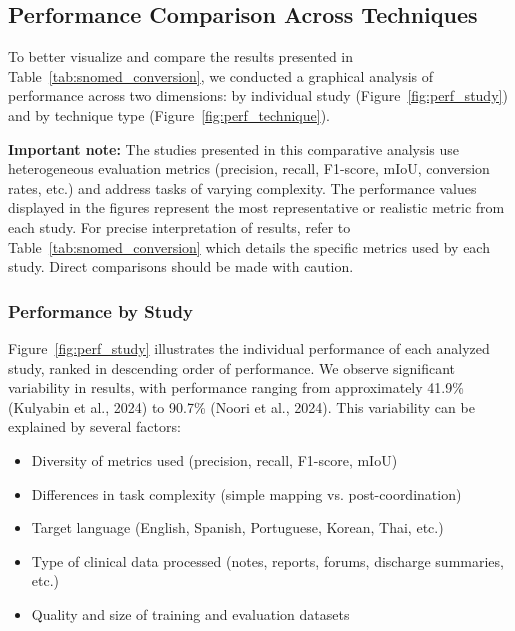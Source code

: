 
\subsection{Performance Comparison Across Techniques}

To better visualize and compare the results presented in Table~\ref{tab:snomed_conversion}, we conducted a graphical analysis of performance across two dimensions: by individual study (Figure~\ref{fig:perf_study}) and by technique type (Figure~\ref{fig:perf_technique}).

\textbf{Important note:} The studies presented in this comparative analysis use heterogeneous evaluation metrics (precision, recall, F1-score, mIoU, conversion rates, etc.) and address tasks of varying complexity. The performance values displayed in the figures represent the most representative or realistic metric from each study. For precise interpretation of results, refer to Table~\ref{tab:snomed_conversion} which details the specific metrics used by each study. Direct comparisons should be made with caution.

\subsubsection{Performance by Study}

Figure~\ref{fig:perf_study} illustrates the individual performance of each analyzed study, ranked in descending order of performance. We observe significant variability in results, with performance ranging from approximately 41.9\% (Kulyabin et al., 2024) to 90.7\% (Noori et al., 2024). This variability can be explained by several factors:

\begin{itemize}
    \item Diversity of metrics used (precision, recall, F1-score, mIoU)
    \item Differences in task complexity (simple mapping vs. post-coordination)
    \item Target language (English, Spanish, Portuguese, Korean, Thai, etc.)
    \item Type of clinical data processed (notes, reports, forums, discharge summaries, etc.)
    \item Quality and size of training and evaluation datasets
\end{itemize}

